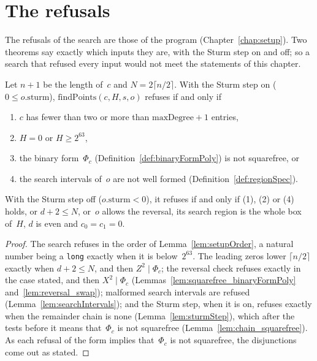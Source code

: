 \section{The refusals}\label{sec:theoremsRefusals}

The refusals of the search are those of the program (Chapter~\ref{chap:setup}). Two theorems say
exactly which inputs they are, with the Sturm step on and off; so a search that refused every input
would not meet the statements of this chapter.

\begin{theorem}\label{thm:refusals}
  \leanok
  Let $n + 1$ be the length of~$c$ and $N = 2 \lceil n/2 \rceil$. With the Sturm step on
  ($0 \le o.\mathrm{sturm}$), $\mathrm{findPoints}(c, H, s, o)$ refuses if and only if
  \begin{enumerate}
    \item $c$ has fewer than two or more than $\mathrm{maxDegree} + 1$ entries,
    \item $H = 0$ or $H \ge 2^{63}$,
    \item the binary form~$\Phi_c$ (Definition~\ref{def:binaryFormPoly}) is not squarefree, or
    \item the search intervals of~$o$ are not well formed (Definition~\ref{def:regionSpec}).
  \end{enumerate}
  With the Sturm step off ($o.\mathrm{sturm} < 0$), it refuses if and only if (1), (2) or (4) holds,
  or $d + 2 \le N$, or~$o$ allows the reversal, its search region is the whole box of~$H$, $d$ is
  even and $c_0 = c_1 = 0$.
\end{theorem}

\begin{proof}
  \leanok
  The search refuses in the order of Lemma~\ref{lem:setupOrder}, a natural number being a
  \verb|long| exactly when it is below~$2^{63}$. The leading zeros lower $\lceil n/2 \rceil$ exactly
  when $d + 2 \le N$, and then $Z^2 \mid \Phi_c$; the reversal check refuses exactly in the case
  stated, and then $X^2 \mid \Phi_c$ (Lemmas~\ref{lem:squarefree_binaryFormPoly}
  and~\ref{lem:reversal_swap}); malformed search intervals are refused
  (Lemma~\ref{lem:searchIntervals}); and the Sturm step, when it is on, refuses exactly when the
  remainder chain is none (Lemma~\ref{lem:sturmStep}), which after the tests before it means
  that~$\Phi_c$ is not squarefree (Lemma~\ref{lem:chain_squarefree}). As each refusal of the form
  implies that~$\Phi_c$ is not squarefree, the disjunctions come out as stated.
\end{proof}

